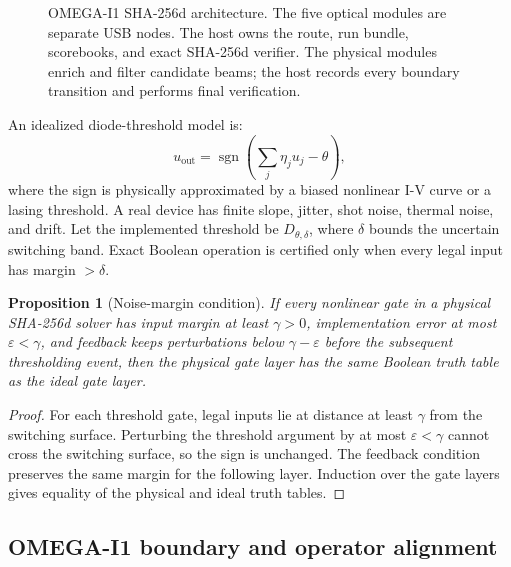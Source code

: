 \documentclass[11pt]{article}
\newtheorem{proposition}[theorem]{Proposition}
\theoremstyle{definition}
\theoremstyle{remark}
\newcommand{\sgn}{\operatorname{sgn}}
\begin{document}
\begin{figure}[t]
{
}
\caption{OMEGA-I1 SHA-256d architecture. The five optical modules are separate
USB nodes. The host owns the route, run bundle, scorebooks, and exact
SHA-256d verifier. The physical modules enrich and filter candidate beams; the
host records every boundary transition and performs final verification.}
\label{fig:hardware}
\end{figure}

An idealized diode-threshold model is:
\[
u_{\mathrm{out}}=\sgn\!\left(\sum_j \eta_j u_j-\theta\right),
\]
where the sign is physically approximated by a biased nonlinear I-V curve or a
lasing threshold. A real device has finite slope, jitter, shot noise, thermal
noise, and drift. Let the implemented threshold be \(D_{\theta,\delta}\), where
\(\delta\) bounds the uncertain switching band. Exact Boolean operation is
certified only when every legal input has margin \(>\delta\).

\begin{proposition}[Noise-margin condition]
If every nonlinear gate in a physical SHA-256d solver has input margin at least
\(\gamma>0\), implementation error at most \(\varepsilon<\gamma\), and feedback
keeps perturbations below \(\gamma-\varepsilon\) before the subsequent
thresholding event, then the physical gate layer has the same Boolean truth
table as the ideal gate layer.
\end{proposition}

\begin{proof}
For each threshold gate, legal inputs lie at distance at least \(\gamma\) from
the switching surface. Perturbing the threshold argument by at most
\(\varepsilon<\gamma\) cannot cross the switching surface, so the sign is
unchanged. The feedback condition preserves the same margin for the following layer.
Induction over the gate layers gives equality of the physical and ideal truth
tables.
\end{proof}

\subsection{OMEGA-I1 boundary and operator alignment}
\end{document}
